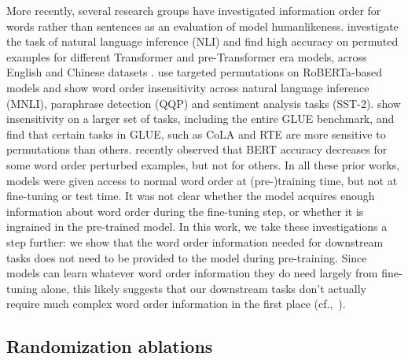 \documentclass[letterpaper, 12pt]{report}
\begin{document}
More recently, several research groups have investigated information order for words rather than sentences as an evaluation of model humanlikeness. %
\citet{sinha2020b} investigate the task of natural language inference (NLI) and find high accuracy on permuted examples for different Transformer and pre-Transformer era models, across English and Chinese datasets \cite{hu-etal-2020-ocnli}.
\citet{gupta-etal-2021-bert} use targeted permutations on RoBERTa-based models and show word order insensitivity across natural language inference (MNLI), paraphrase detection (QQP) and sentiment analysis tasks (SST-2).
\citet{pham2020} show insensitivity on a larger set of tasks, including the entire GLUE benchmark, and find that certain tasks in GLUE, such as CoLA and RTE are more sensitive to permutations than others.
\cite{ettinger-2020-whatbertisnot} recently observed that BERT accuracy decreases for some word order perturbed examples, but not for others.
In all these prior works, models were given access to normal word order at (pre-)training time, but not at fine-tuning or test time. It was not clear whether the model acquires enough information about word order during the fine-tuning step, or whether it is ingrained in the pre-trained model.
In this work, we take these investigations a step further: we show that the word order information needed for downstream tasks does not need to be provided to the model during pre-training. Since models can learn whatever word order information they do need largely from fine-tuning alone, this likely suggests that our downstream tasks don't actually require much complex word order information in the first place (cf.,\ \citealt{glavas-vulic-2021-supervised}).

\subsection{Randomization ablations}
\end{document}
